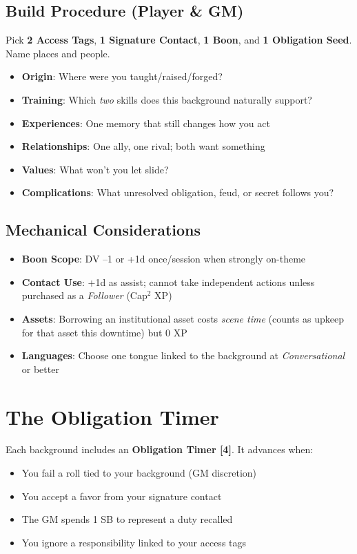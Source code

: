 \subsection*{Build Procedure (Player \& GM)}
Pick \textbf{2 Access Tags}, \textbf{1 Signature Contact}, \textbf{1 Boon}, and \textbf{1 Obligation Seed}. Name places and people.
\begin{itemize}
\item \textbf{Origin}: Where were you taught/raised/forged?
\item \textbf{Training}: Which \emph{two} skills does this background naturally support?
\item \textbf{Experiences}: One memory that still changes how you act
\item \textbf{Relationships}: One ally, one rival; both want something
\item \textbf{Values}: What won't you let slide?
\item \textbf{Complications}: What unresolved obligation, feud, or secret follows you?
\end{itemize}

\subsection*{Mechanical Considerations}
\begin{itemize}
\item \textbf{Boon Scope}: DV --1 or +1d once/session when strongly on-theme
\item \textbf{Contact Use}: +1d as assist; cannot take independent actions unless purchased as a \emph{Follower} (Cap\(^2\) XP)
\item \textbf{Assets}: Borrowing an institutional asset costs \emph{scene time} (counts as upkeep for that asset this downtime) but 0 XP
\item \textbf{Languages}: Choose one tongue linked to the background at \emph{Conversational} or better
\end{itemize}

\section{The Obligation Timer}
\label{sec:bg-obligation}

Each background includes an \textbf{Obligation Timer [4]}. It advances when:
\begin{itemize}
\item You fail a roll tied to your background (GM discretion)
\item You accept a favor from your signature contact
\item The GM spends 1 SB to represent a duty recalled
\item You ignore a responsibility linked to your access tags
\end{itemize}

